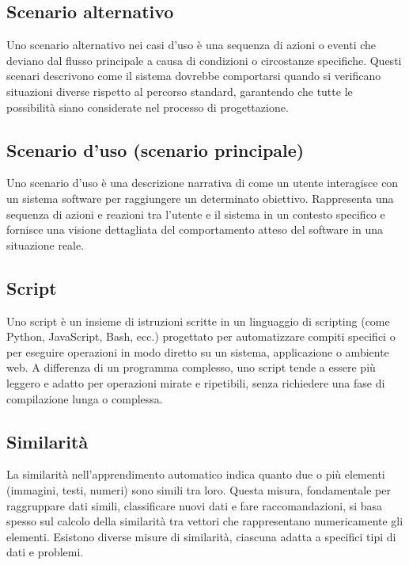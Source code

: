 
\hypertarget{sec:scenario_alternativo}{}
\subsection*{Scenario alternativo}
Uno scenario alternativo nei casi d'uso è una sequenza di azioni o eventi che deviano dal flusso principale a causa di condizioni o circostanze specifiche. 
Questi scenari descrivono come il sistema dovrebbe comportarsi quando si verificano situazioni diverse rispetto al percorso standard, garantendo che tutte 
le possibilità siano considerate nel processo di progettazione.

\hypertarget{sec:scenario_uso}{}
\subsection*{Scenario d'uso (scenario principale)}
Uno scenario d'uso è una descrizione narrativa di come un utente interagisce con un sistema software per raggiungere un determinato obiettivo. Rappresenta 
una sequenza di azioni e reazioni tra l'utente e il sistema in un contesto specifico e fornisce una visione dettagliata del comportamento atteso del software 
in una situazione reale.

\subsection*{Script}
Uno script è un insieme di istruzioni scritte in un linguaggio di scripting (come Python, JavaScript, Bash, ecc.) progettato per automatizzare compiti 
specifici o per eseguire operazioni in modo diretto su un sistema, applicazione o ambiente web. A differenza di un programma complesso, uno script tende 
a essere più leggero e adatto per operazioni mirate e ripetibili, senza richiedere una fase di compilazione lunga o complessa.

\hypertarget{sec:similarità}{}
\subsection*{Similarità}
La similarità nell'apprendimento automatico indica quanto due o più elementi (immagini, testi, numeri) sono simili tra loro. 
Questa misura, fondamentale per raggruppare dati simili, classificare nuovi dati e fare raccomandazioni, si basa spesso sul calcolo 
della similarità tra vettori che rappresentano numericamente gli elementi. Esistono diverse misure di similarità, ciascuna adatta a 
specifici tipi di dati e problemi.

